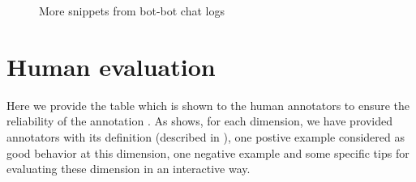 \begin{figure}[ht]
 \caption{More snippets from bot-bot chat logs}
\label{fig:fourconvs}
\end{figure}

\section{Human evaluation}
\label{sec:humanappend}
Here we provide the table which is shown 
to the human annotators to ensure the reliability of the  annotation .
As  shows, for each dimension, we have provided annotators
with its definition (described in ), 
one postive example considered as good 
behavior at this dimension,
one negative example and 
some specific tips for
evaluating these dimension
in an interactive way.


